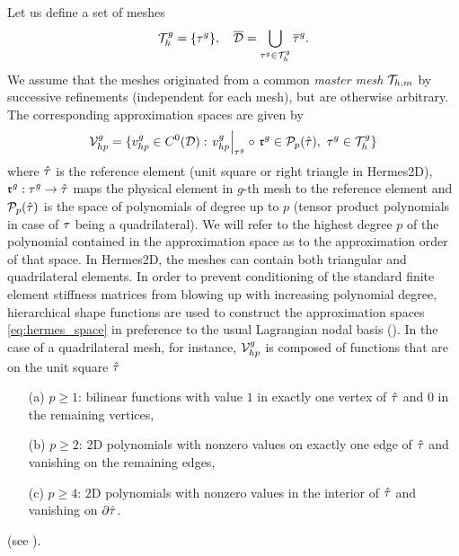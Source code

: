 Let us define a set of meshes 
$$ \mesh^g = \{\elem^g\},\quad
	\overline{\VV} = \bigcup_{\elem^g\in\mesh^g} \overline\elem^g.
$$
We assume that the meshes originated from a common \textit{master mesh} $\mesh[h,m]$ by successive refinements
(independent for each mesh), but are otherwise arbitrary. The corresponding approximation
spaces are given by
\begin{equation}\label{eq:hermes_space}
	\Space_{hp}^g = \{v_{hp}^g \in C^0(\VV): \left. v_{hp}^g\right\vert_{\elem^g} \circ\, \mathfrak{r}^g \in
	\mathcal{P}_{p}(\hat{\elem}),\ \elem^g\in\mesh^g
	\}
\end{equation}
where $\hat{\elem}$ is the reference element (unit square or right triangle in Hermes2D), $\mathfrak{r}^g :
\elem^g \to \hat{\elem} $ maps the physical element in $g$-th mesh to the reference element and
$\mathcal{P}_{p}(\hat{\elem})$ is the space of polynomials of degree up to $p$ (tensor product polynomials in case of
$\elem$ being a quadrilateral). We will refer to the highest degree $p$ of the polynomial contained in the approximation
space as to the approximation order of that space. In Hermes2D, the meshes can contain both
triangular and quadrilateral elements. In order to prevent conditioning of the standard finite element stiffness matrices from blowing up with
increasing polynomial degree, hierarchical shape functions are used to construct the approximation spaces \eqref{eq:hermes_space} in
preference to the usual Lagrangian nodal basis (\cite[Sec. 2.5.3]{Hermes-book2}). In the case of a quadrilateral
mesh, for instance, $\Space_{hp}^g$ is composed of functions that are on the unit square $\hat\elem$
\begin{enumerate}
	\item[(a)] $p \geq 1$: bilinear functions with value $1$ in exactly one vertex of $\hat\elem$ and $0$
	in the remaining vertices,
	\item[(b)] $p \geq 2$: 2D polynomials with nonzero values on exactly one edge of $\hat\elem$ and vanishing on the
	remaining edges,
	\item[(c)] $p \geq 4$: 2D polynomials with nonzero values in the interior of $\hat\elem$ and vanishing on
	$\partial \hat\elem$.
\end{enumerate}
(see ).

